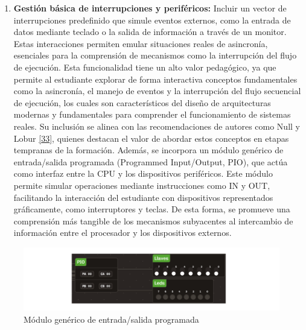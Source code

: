 \documentclass[12pt,oneside]{templates/unerthesis}
\providecommand{\tightlist}{%
  \setlength{\itemsep}{0pt}\setlength{\parskip}{0pt}}
\begin{document}
\begin{enumerate}
\def\labelenumi{\arabic{enumi}.}
\setcounter{enumi}{4}
\tightlist
\item
  \textbf{Gestión básica de interrupciones y periféricos:}
  Incluir un vector de interrupciones predefinido que simule eventos externos, como la entrada de datos mediante teclado o la salida de información a través de un monitor. Estas interacciones permiten emular situaciones reales de asincronía, esenciales para la comprensión de mecanismos como la interrupción del flujo de ejecución. Esta funcionalidad tiene un alto valor pedagógico, ya que permite al estudiante explorar de forma interactiva conceptos fundamentales como la asincronía, el manejo de eventos y la interrupción del flujo secuencial de ejecución, los cuales son característicos del diseño de arquitecturas modernas y fundamentales para comprender el funcionamiento de sistemas reales. Su inclusión se alinea con las recomendaciones de autores como Null y Lobur \protect\hyperlink{ref-null_essentials_2023}{{[}33{]}}, quienes destacan el valor de abordar estos conceptos en etapas tempranas de la formación. Además, se incorpora un módulo genérico de entrada/salida programada (Programmed Input/Output, PIO), que actúa como interfaz entre la CPU y los dispositivos periféricos. Este módulo permite simular operaciones mediante instrucciones como IN y OUT, facilitando la interacción del estudiante con dispositivos representados gráficamente, como interruptores y teclas. De esta forma, se promueve una comprensión más tangible de los mecanismos subyacentes al intercambio de información entre el procesador y los dispositivos externos.
\end{enumerate}

\begin{figure}

{\centering \includegraphics[width=0.85\linewidth]{images/perifericos} 

}

\caption{Módulo genérico de entrada/salida programada}\label{fig:perifericos}
\end{figure}
\end{document}
